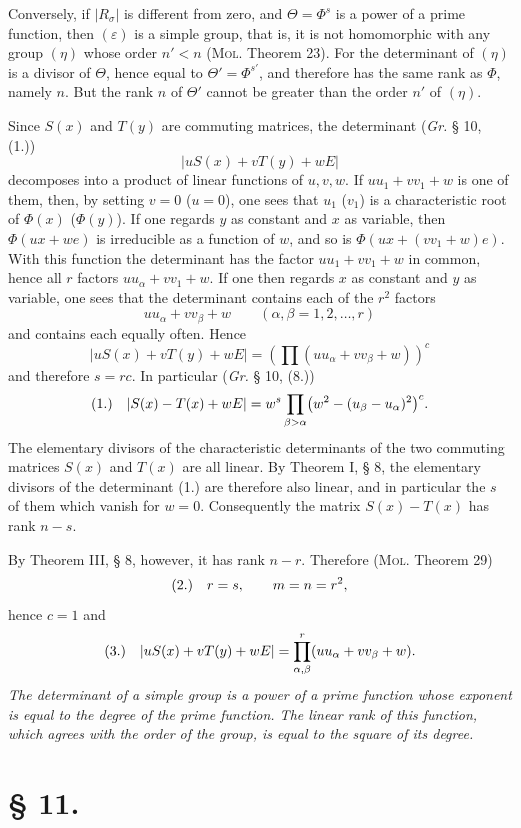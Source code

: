 \documentclass[11pt]{article}
\newcommand{\eps}{\varepsilon}
\newcommand{\fnum}[1]{\textup{(\ensuremath{#1}.)}\quad}
\begin{document}
Conversely, if $|R_\sigma|$ is different from zero, and $\Theta=\Phi^s$ is a power of a prime function, then $(\eps)$ is a simple group, that is, it is not homomorphic with any group $(\eta)$ whose order $n'<n$ (\textsc{Mol}. Theorem 23). For the determinant of $(\eta)$ is a divisor of $\Theta$, hence equal to $\Theta'=\Phi^{s'}$, and therefore has the same rank as $\Phi$, namely $n$. But the rank $n$ of $\Theta'$ cannot be greater than the order $n'$ of $(\eta)$.

Since $S(x)$ and $T(y)$ are commuting matrices, the determinant (\emph{Gr.} § 10, (1.))
\[
 |uS(x)+vT(y)+wE|
\]
decomposes into a product of linear functions of $u,v,w$. If $uu_1+vv_1+w$ is one of them, then, by setting $v=0$ ($u=0$), one sees that $u_1$ ($v_1$) is a characteristic root of $\Phi(x)$ ($\Phi(y)$). If one regards $y$ as constant and $x$ as variable, then $\Phi(ux+we)$ is irreducible as a function of $w$, and so is $\Phi(ux+(vv_1+w)e)$. With this function the determinant has the factor $uu_1+vv_1+w$ in common, hence all $r$ factors $uu_\alpha+vv_1+w$. If one then regards $x$ as constant and $y$ as variable, one sees that the determinant contains each of the $r^2$ factors
\[
 uu_\alpha+vv_\beta+w\qquad(\alpha,\beta=1,2,\ldots,r)
\]
and contains each equally often. Hence
\[
 |uS(x)+vT(y)+wE|=\left(\prod(uu_\alpha+vv_\beta+w)\right)^c
\]
and therefore $s=rc$. In particular (\emph{Gr.} § 10, (8.))
\[
\fnum{1} |S(x)-T(x)+wE|=w^s\prod_{\beta>\alpha}\bigl(w^2-(u_\beta-u_\alpha)^2\bigr)^c.
\]
The elementary divisors of the characteristic determinants of the two commuting matrices $S(x)$ and $T(x)$ are all linear. By Theorem I, § 8, the elementary divisors of the determinant (1.) are therefore also linear, and in particular the $s$ of them which vanish for $w=0$. Consequently the matrix $S(x)-T(x)$ has rank $n-s$.

By Theorem III, § 8, however, it has rank $n-r$. Therefore (\textsc{Mol}. Theorem 29)
\[
\fnum{2} r=s,
\qquad m=n=r^2,
\]
hence $c=1$ and
\[
\fnum{3} |uS(x)+vT(y)+wE|=\prod_{\alpha,\beta}^{r}(uu_\alpha+vv_\beta+w).
\]
\emph{The determinant of a simple group is a power of a prime function whose exponent is equal to the degree of the prime function. The linear rank of this function, which agrees with the order of the group, is equal to the square of its degree.}

\section*{§ 11.}
\end{document}
